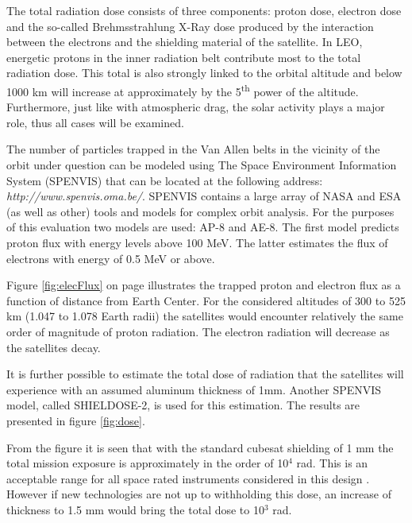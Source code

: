 The total radiation dose consists of three components: proton dose, electron dose and the so-called Brehmsstrahlung X-Ray dose produced by the interaction between the electrons and the shielding material of the satellite. In \ac{LEO}, energetic protons in the inner radiation belt contribute most to the total radiation dose. This total is also strongly linked to the orbital altitude and below 1000 km will increase at approximately by the 5\textsuperscript{th} power of the altitude. Furthermore, just like with atmospheric drag, the solar activity plays a major role, thus all cases will be examined.

The number of particles trapped in the Van Allen belts in the vicinity of the orbit under question can be modeled using The Space Environment Information System (SPENVIS) that can be located at the following address: \emph{http://www.spenvis.oma.be/}. SPENVIS contains a large array of NASA and ESA (as well as other) tools and models for complex orbit analysis. For the purposes of this evaluation two models are used: AP-8 and AE-8. The first model predicts proton flux with energy levels above 100 MeV. The latter estimates the flux of electrons with energy of 0.5 MeV or above.

Figure \ref{fig:elecFlux} on page \pageref{fig:elecFlux} illustrates the trapped proton and electron flux as a function of distance from Earth Center. For the considered altitudes of 300 to 525 km (1.047 to 1.078 Earth radii) the satellites would encounter relatively the same order of magnitude of proton radiation. The electron radiation will decrease as the satellites decay.

It is further possible to estimate the total dose of radiation that the satellites will experience with an assumed aluminum thickness of 1mm. Another SPENVIS model, called SHIELDOSE-2, is used for this estimation. The results are presented in figure \ref{fig:dose}.

From the figure it is seen that with the standard cubesat shielding of 1 mm the total mission exposure is approximately in the order of 10$^4$ rad. This is an acceptable range for all space rated instruments considered in this design \cite{larson}. However if new technologies are not up to withholding this dose, an increase of thickness to 1.5 mm would bring the total dose to 10$^3$ rad. 


